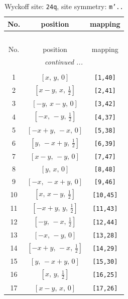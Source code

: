 \documentclass[fleqn,8pt]{jsarticle}
\begin{document}
\begin{longtable}{ccc}
\caption{Wyckoff site: {\tt 24q}, site symmetry: {\tt m'..}}
 \\
 \hline \hline
No. & position & mapping \\ \hline \endfirsthead

\multicolumn{2}{l}{\tablename\ \thetable{}} \\
 \hline \hline
No. & position & mapping \\ \hline \endhead

 \hline \hline
\multicolumn{2}{r}{\footnotesize\it continued ...} \\ \endfoot

 \hline \hline
\multicolumn{2}{r}{} \\ \endlastfoot

1 & $\left[ x,\, y,\, 0 \right]$ & {\tt [1,40]} \\ \hline
2 & $\left[ x - y,\, x,\, \frac{1}{2} \right]$ & {\tt [2,41]} \\ \hline
3 & $\left[ - y,\, x - y,\, 0 \right]$ & {\tt [3,42]} \\ \hline
4 & $\left[ - x,\, - y,\, \frac{1}{2} \right]$ & {\tt [4,37]} \\ \hline
5 & $\left[ - x + y,\, - x,\, 0 \right]$ & {\tt [5,38]} \\ \hline
6 & $\left[ y,\, - x + y,\, \frac{1}{2} \right]$ & {\tt [6,39]} \\ \hline
7 & $\left[ x - y,\, - y,\, 0 \right]$ & {\tt [7,47]} \\ \hline
8 & $\left[ y,\, x,\, 0 \right]$ & {\tt [8,48]} \\ \hline
9 & $\left[ - x,\, - x + y,\, 0 \right]$ & {\tt [9,46]} \\ \hline
10 & $\left[ x,\, x - y,\, \frac{1}{2} \right]$ & {\tt [10,45]} \\ \hline
11 & $\left[ - x + y,\, y,\, \frac{1}{2} \right]$ & {\tt [11,43]} \\ \hline
12 & $\left[ - y,\, - x,\, \frac{1}{2} \right]$ & {\tt [12,44]} \\ \hline
13 & $\left[ - x,\, - y,\, 0 \right]$ & {\tt [13,28]} \\ \hline
14 & $\left[ - x + y,\, - x,\, \frac{1}{2} \right]$ & {\tt [14,29]} \\ \hline
15 & $\left[ y,\, - x + y,\, 0 \right]$ & {\tt [15,30]} \\ \hline
16 & $\left[ x,\, y,\, \frac{1}{2} \right]$ & {\tt [16,25]} \\ \hline
17 & $\left[ x - y,\, x,\, 0 \right]$ & {\tt [17,26]} \\ \hline

\end{longtable}
\end{document}
